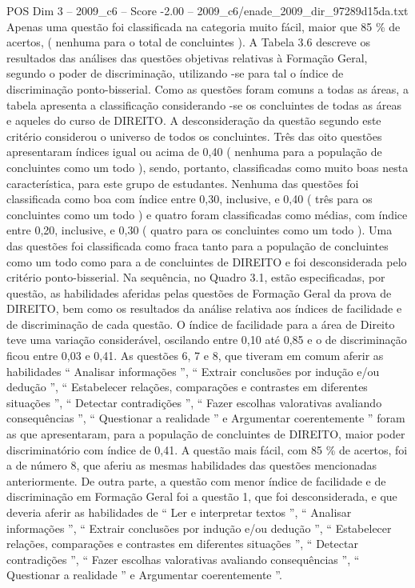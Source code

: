 \begin{textsample}{POS Dim 3 – 2009\_c6 – Score -2.00 – 2009\_c6/enade\_2009\_dir\_97289d15da.txt}
Apenas uma questão foi classificada na categoria muito fácil, maior que 85 \% de acertos, ( nenhuma para o total de concluintes ).
A Tabela 3.6 descreve os resultados das análises das questões objetivas relativas à Formação Geral, segundo o poder de discriminação, utilizando -se para tal o índice de discriminação ponto-bisserial.
Como as questões foram comuns a todas as áreas, a tabela apresenta a classificação considerando -se os concluintes de todas as áreas e aqueles do curso de DIREITO.
A desconsideração da questão segundo este critério considerou o universo de todos os concluintes.
Três das oito questões apresentaram índices igual ou acima de 0,40 ( nenhuma para a população de concluintes como um todo ), sendo, portanto, classificadas como muito boas nesta característica, para este grupo de estudantes.
Nenhuma das questões foi classificada como boa com índice entre 0,30, inclusive, e 0,40 ( três para os concluintes como um todo ) e quatro foram classificadas como médias, com índice entre 0,20, inclusive, e 0,30 ( quatro para os concluintes como um todo ).
Uma das questões foi classificada como fraca tanto para a população de concluintes como um todo como para a de concluintes de DIREITO e foi desconsiderada pelo critério ponto-bisserial.
Na sequência, no Quadro 3.1, estão especificadas, por questão, as habilidades aferidas pelas questões de Formação Geral da prova de DIREITO, bem como os resultados da análise relativa aos índices de facilidade e de discriminação de cada questão.
O índice de facilidade para a área de Direito teve uma variação considerável, oscilando entre 0,10 até 0,85 e o de discriminação ficou entre 0,03 e 0,41.
As questões 6, 7 e 8, que tiveram em comum aferir as habilidades “ Analisar informações ”, “ Extrair conclusões por indução e/ou dedução ”, “ Estabelecer relações, comparações e contrastes em diferentes situações ”, “ Detectar contradições ”, “ Fazer escolhas valorativas avaliando consequências ”, “ Questionar a realidade ” e Argumentar coerentemente ” foram as que apresentaram, para a população de concluintes de DIREITO, maior poder discriminatório com índice de 0,41.
A questão mais fácil, com 85 \% de acertos, foi a de número 8, que aferiu as mesmas habilidades das questões mencionadas anteriormente.
De outra parte, a questão com menor índice de facilidade e de discriminação em Formação Geral foi a questão 1, que foi desconsiderada, e que deveria aferir as habilidades de “ Ler e interpretar textos ”, “ Analisar informações ”, “ Extrair conclusões por indução e/ou dedução ”, “ Estabelecer relações, comparações e contrastes em diferentes situações ”, “ Detectar contradições ”, “ Fazer escolhas valorativas avaliando consequências ”, “ Questionar a realidade ” e Argumentar coerentemente ”.

\end{textsample}
